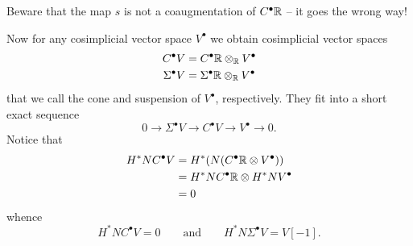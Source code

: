 \documentclass{amsart}
\begin{document}
\begin{remark}
    Beware that the map $s$ is not a coaugmentation of $C^\bullet\mathbb{R}$ -- it
    goes the wrong way!
\end{remark}

Now for any cosimplicial vector space $V^\bullet$ we obtain cosimplicial vector 
spaces
\begin{align*}
    C^\bullet V &= C^\bullet\mathbb{R} \otimes_{\mathbb{R}} V^\bullet \\
    \Sigma^\bullet V &= \Sigma^\bullet \mathbb{R} \otimes_{\mathbb{R}} V^\bullet
\end{align*}
that we call the cone and suspension of $V^\bullet$, respectively.
They fit into a short exact sequence
\begin{equation*}
    0 \to \Sigma^\bullet V \to C^\bullet V \to V^\bullet \to 0.
\end{equation*}
Notice that 
\begin{align*}
    H^*NC^\bullet V &= H^*(N(C^\bullet\mathbb{R} \otimes V^\bullet)) \\
    &= H^*NC^\bullet\mathbb{R} \otimes H^*NV^\bullet \\
    &= 0
\end{align*}
whence
\begin{equation*}
    H^*NC^\bullet V = 0 \qquad \text{and} \qquad H^*N\Sigma^\bullet V=V[-1].
\end{equation*}
\end{document}
